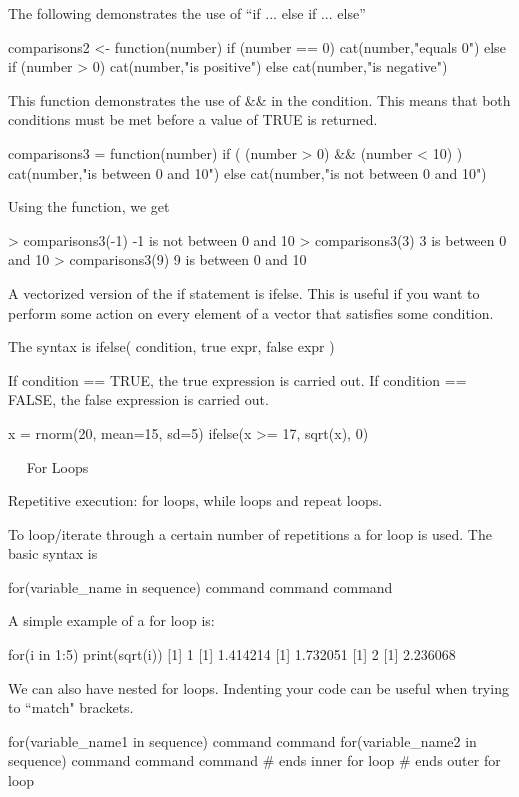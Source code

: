 The following demonstrates the use of “if ... else if ... else”

comparisons2 <- function(number)
  {
  if (number == 0)
      {
       cat(number,"equals 0\n")
      }
  else if (number > 0)
      {
       cat(number,"is positive\n")
      }
  else{
      cat(number,"is negative\n")
      }
  }



This function demonstrates the use of && in the condition. This means that both conditions must be met before a value of TRUE is returned.




comparisons3 = function(number)
   {
   if ( (number > 0) && (number < 10) )
      {
      cat(number,"is between 0 and 10\n")
      }
   else{
   cat(number,"is not between 0 and 10\n")
     }
   }


Using the function, we get

> comparisons3(-1)
-1 is not between 0 and 10
> comparisons3(3)
3 is between 0 and 10
> comparisons3(9)
9 is between 0 and 10


A vectorized version of the if statement is ifelse. This is useful if you want to perform some action on every element of a vector that satisfies some condition.

The syntax is
ifelse( condition, true expr, false expr )

If condition == TRUE, the true expression is carried out. 
If condition == FALSE, the false expression is carried out.

x = rnorm(20, mean=15, sd=5)
ifelse(x >= 17, sqrt(x), 0)




 
For Loops

Repetitive execution: for loops, while loops and repeat loops.

To loop/iterate through a certain number of repetitions a for loop
is used. The basic syntax is

for(variable_name in sequence) {
command
command
command
}

A simple example of a for loop is:

for(i in 1:5){
print(sqrt(i))
}
[1] 1
[1] 1.414214
[1] 1.732051
[1] 2
[1] 2.236068


We can also have nested for loops. Indenting your code can be useful
when trying to “match" brackets.

for(variable_name1 in sequence) 
{
command
command
for(variable_name2 in sequence)
    {
    command
    command 
    command
    } # ends inner for loop
} # ends outer for loop

